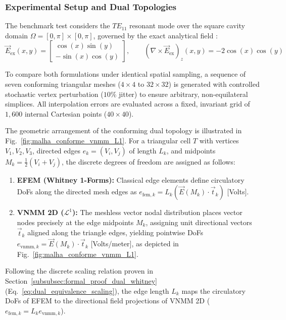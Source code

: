 \documentclass[preprint,12pt]{elsarticle}
\begin{document}
\subsubsection{Experimental Setup and Dual Topologies}
The benchmark test considers the $TE_{11}$ resonant mode over the square cavity domain $\Omega = [0, \pi] \times [0, \pi]$, governed by the exact analytical field \cite{harrington2001time, jin2014finite}:
\begin{equation}
\vec{E}_{\mathrm{ex}}(x, y) = \begin{bmatrix} \cos(x) \sin(y) \\[2pt] -\sin(x) \cos(y) \end{bmatrix}, \qquad (\nabla \times \vec{E}_{\mathrm{ex}})_z(x, y) = -2 \cos(x) \cos(y)
\label{eq:analytical_te11_field}
\end{equation}

To compare both formulations under identical spatial sampling, a sequence of seven conforming triangular meshes ($4\times4$ to $32\times32$) is generated with controlled stochastic vertex perturbation ($10\%$ jitter) to ensure arbitrary, non-equilateral simplices. All interpolation errors are evaluated across a fixed, invariant grid of $1{,}600$ internal Cartesian points ($40 \times 40$).

The geometric arrangement of the conforming dual topology is illustrated in Fig.~\ref{fig:malha_conforme_vnmm_L1}. For a triangular cell $T$ with vertices $V_1, V_2, V_3$, directed edges $e_k = (V_i, V_j)$ of length $L_k$, and midpoints $M_k = \frac{1}{2}(V_i + V_j)$, the discrete degrees of freedom are assigned as follows:
\begin{enumerate}
    \item \textbf{EFEM (Whitney 1-Forms):} Classical edge elements define circulatory DoFs along the directed mesh edges as $e_{\mathrm{fem}, k} = L_k (\vec{E}(M_k) \cdot \vec{t}_k)$ [Volts].
    \item \textbf{VNMM 2D ($\mathcal{L}^1$):} The meshless vector nodal distribution places vector nodes precisely at the edge midpoints $M_k$, assigning unit directional vectors $\vec{t}_k$ aligned along the triangle edges, yielding pointwise DoFs $e_{\mathrm{vnmm}, k} = \vec{E}(M_k) \cdot \vec{t}_k$ [Volts/meter], as depicted in Fig.~\ref{fig:malha_conforme_vnmm_L1}.
\end{enumerate}

Following the discrete scaling relation proven in Section~\ref{subsubsec:formal_proof_dual_whitney} (Eq.~\eqref{eq:dual_equivalence_scaling}), the edge length $L_k$ maps the circulatory DoFs of EFEM to the directional field projections of VNMM 2D ($e_{\mathrm{fem}, k}= L_k e_{\mathrm{vnmm}, k}$).
\end{document}
